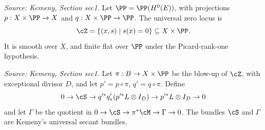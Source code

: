 \begin{definition}
  \label{def:kemeny_universal_zero_locus}
  \textit{Source: Kemeny, Section sec1.}
  Let \(\PP=\PP(H^0(E))\), with projections \(p:X\times\PP\to X\) and
  \(q:X\times\PP\to\PP\).  The universal zero locus is
  \[
    \cZ=\{(x,s)\mid s(x)=0\}\subseteq X\times\PP .
  \]
  It is smooth over \(X\), and finite flat over \(\PP\) under the Picard-rank-one
  hypothesis.
\end{definition}

\begin{definition}
  \label{def:kemeny_universal_secant_bundles}
  \textit{Source: Kemeny, Section sec1.}
  Let \(\pi:B\to X\times\PP\) be the blow-up of \(\cZ\), with exceptional
  divisor \(D\), and let \(p'=p\circ\pi\), \(q'=q\circ\pi\).  Define
  \[
    0\to\cS\to q'^*q'_*(p'^*L\otimes I_D)\to p'^*L\otimes I_D\to0
  \]
  and let \(\Gamma\) be the quotient in
  \(0\to\cS\to\pi^*\cM\to\Gamma\to0\).  The bundles \(\cS\) and \(\Gamma\) are
  Kemeny's universal secant bundles.
\end{definition}

